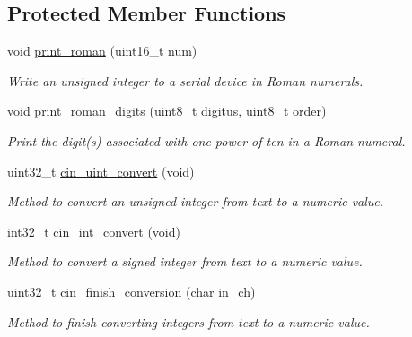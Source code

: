 \subsection*{Protected Member Functions}
\begin{DoxyCompactItemize}
\item 
void \mbox{\hyperlink{classemstream_a54b87cf8b620a80e7f4f69445973158a}{print\+\_\+roman}} (uint16\+\_\+t num)
\begin{DoxyCompactList}\small\item\em Write an unsigned integer to a serial device in Roman numerals. \end{DoxyCompactList}\item 
\mbox{\label{classemstream_a439bc9e2b9fa3e9785e844c07cc288c7}} 
void \mbox{\hyperlink{classemstream_a439bc9e2b9fa3e9785e844c07cc288c7}{print\+\_\+roman\+\_\+digits}} (uint8\+\_\+t digitus, uint8\+\_\+t order)
\begin{DoxyCompactList}\small\item\em Print the digit(s) associated with one power of ten in a Roman numeral. \end{DoxyCompactList}\item 
uint32\+\_\+t \mbox{\hyperlink{classemstream_a38b9f36ce6ccd5acf98acb8523568d46}{cin\+\_\+uint\+\_\+convert}} (void)
\begin{DoxyCompactList}\small\item\em Method to convert an unsigned integer from text to a numeric value. \end{DoxyCompactList}\item 
int32\+\_\+t \mbox{\hyperlink{classemstream_ab2c0624ac11a6da71db92d94b6da32aa}{cin\+\_\+int\+\_\+convert}} (void)
\begin{DoxyCompactList}\small\item\em Method to convert a signed integer from text to a numeric value. \end{DoxyCompactList}\item 
uint32\+\_\+t \mbox{\hyperlink{classemstream_a38238da76568289a5f510c2fcbea4121}{cin\+\_\+finish\+\_\+conversion}} (char in\+\_\+ch)
\begin{DoxyCompactList}\small\item\em Method to finish converting integers from text to a numeric value. \end{DoxyCompactList}\end{DoxyCompactItemize}
